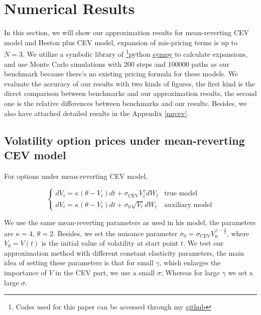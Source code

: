 \chapter{Numerical Results}

In this section, we will show our approximation results for mean-reverting CEV model and Heston plus CEV model, expansion of mis-pricing terms is up to $N=3$. We utilize a symbolic library of \footnote{Codes used for this paper can be accessed through my \href{https://github.com/ywang408/master-thesis-code}{github}}{python} \href{https://www.sympy.org/en/index.html}{sympy} to calculate expansions, and use Monte Carlo simulations with 200 steps and 100000 paths as our benchmark because there's no existing pricing formula for these models. We evaluate the accuracy of our results with two kinds of figures, the first kind is the direct comparison between benchmarks and our approximation results, the second one is the relative differences between benchmarks and our results. Besides, we also have attached detailed results in the Appendix \ref{mrcev}.

\section{Volatility option prices under mean-reverting CEV model}

For options under mean-reverting CEV model,

$$
  \begin{cases}
    d V_t=\kappa(\theta - V_t) d t+\sigma_{\text{CEV}} V^{\gamma}_t d W_t &\text{true model}\\
    d V_t=\kappa(\theta - V_t) d t+\sigma_0 \sqrt{V_t} d W_t &\text{auxiliary model}
  \end{cases}
$$

We use the same mean-reverting parameters as \cite{grunbichler_valuing_1996} used in his model, the parameters are $\kappa=4$, $\theta=2$. Besides, we set the nuisance parameter $\sigma_0 = \sigma_{\text{CEV}} V_0^{\gamma-\frac{1}{2}}$, where $V_0=V(t)$ is the initial value of volatility at start point $t$. We test our approximation method with different constant elasticity parameters, the main idea of setting these parameters is that for small $\gamma$, which enlarges the importance of $V$ in the CEV part, we use a small $\sigma$; Whereas for large $\gamma$ we set a large $\sigma$. 

